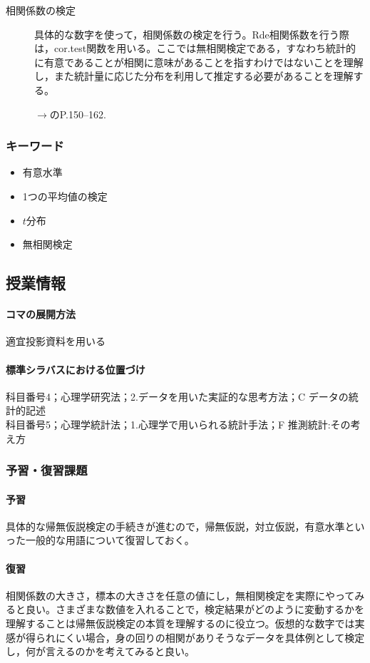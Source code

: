 \begin{description}

	\item[相関係数の検定]具体的な数字を使って，相関係数の検定を行う。Rde相関係数を行う際は，cor.test関数を用いる。ここでは無相関検定である，すなわち統計的に有意であることが相関に意味があることを指すわけではないことを理解し，また統計量に応じた分布を利用して推定する必要があることを理解する。
	      \begin{flushright}
		      $\to$\textcite{Shimizu2021}のP.150--162.
	      \end{flushright}

\end{description}
\subsubsection{キーワード}
\begin{itemize}
	\item 有意水準
	\item 1つの平均値の検定
	\item $t$分布
	\item 無相関検定
\end{itemize}
\subsection{授業情報}
\paragraph{コマの展開方法}
適宜投影資料を用いる
\paragraph{標準シラバスにおける位置づけ}
科目番号4；心理学研究法；2.データを用いた実証的な思考方法；C データの統計的記述\\
科目番号5；心理学統計法；1.心理学で用いられる統計手法；F 推測統計:その考え方
\subsubsection{予習・復習課題}
\paragraph{予習}
具体的な帰無仮説検定の手続きが進むので，帰無仮説，対立仮説，有意水準といった一般的な用語について復習しておく。
\paragraph{復習}
相関係数の大きさ，標本の大きさを任意の値にし，無相関検定を実際にやってみると良い。さまざまな数値を入れることで，検定結果がどのように変動するかを理解することは帰無仮説検定の本質を理解するのに役立つ。仮想的な数字では実感が得られにくい場合，身の回りの相関がありそうなデータを具体例として検定し，何が言えるのかを考えてみると良い。
